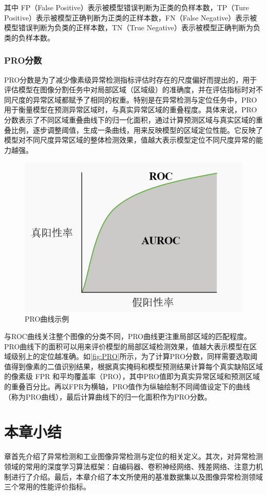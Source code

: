 \documentclass[lang=chs, degree=master, blindreview=false, adobe=false]{yanputhesis}
\begin{document}
其中 FP（False Positive）表示被模型错误判断为正类的负样本数，TP（Ture Positive）表示被模型正确判断为正类的正样本数，FN（False Negative）表示被模型错误判断为负类的正样本数，TN（True Negative）表示被模型正确判断为负类的负样本数。

\subsubsection{PRO分数}

PRO分数\cite{bergmann2020uninformed}是为了减少像素级异常检测指标评估时存在的尺度偏好而提出的，用于评估模型在图像分割任务中对局部区域（区域级）的准确度，并在评估指标时对不同尺度的异常区域都赋予了相同的权重。特别是在异常检测与定位任务中，PRO用于衡量模型在预测异常区域时，与真实异常区域的重叠程度。具体来说，PRO分数表示了不同区域重叠曲线下的归一化面积，通过计算预测区域与真实区域的重叠比例，逐步调整阈值，生成一条曲线，用来反映模型的区域定位性能。它反映了模型对不同尺度异常区域的整体检测效果，值越大表示模型定位不同尺度异常的能力越强。

\begin{figure}[H]
	\centering
	\includegraphics[width=0.5\linewidth]{figs/PRO.png}
	\caption{PRO曲线示例}
	\label{fig:PRO}
\end{figure}

与ROC曲线关注整个图像的分类不同，PRO曲线更注重局部区域的匹配程度。PRO曲线下的面积可以用来评价模型的局部区域检测效果，值越大表示模型在区域级别上的定位越准确。如\autoref{fig:PRO}所示，为了计算PRO分数，同样需要选取阈值得到像素的二值识别结果，根据真实掩码和模型预测结果计算每个真实缺陷区域的像素级 FPR 和平均覆盖率（PRO），其中PRO值即为真实异常区域和预测区域的重叠百分比。再以FPR为横轴，PRO值作为纵轴绘制不同阈值设定下的曲线（称为PRO曲线），最后计算曲线下的归一化面积作为PRO分数。

\section{本章小结}

章首先介绍了异常检测和工业图像异常检测与定位的相关定义。其次，对异常检测领域的常用的深度学习算法框架：自编码器、卷积神经网络、残差网络、注意力机制进行了介绍。最后，本章介绍了本文所使用的基准数据集以及图像异常检测领域三个常用的性能评价指标。
\end{document}
